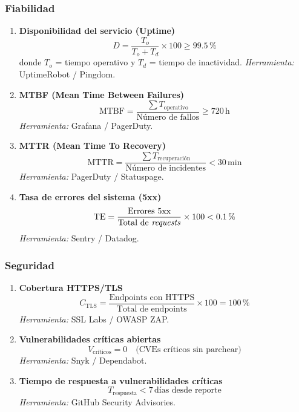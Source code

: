 \documentclass[12pt, a4paper]{article}
\begin{document}
\subsubsection*{Fiabilidad}

\begin{enumerate}[leftmargin=*, label=\textbf{KPI \arabic*.}, start=14]

    \item \textbf{Disponibilidad del servicio (Uptime)}
    \[
        D = \frac{T_o}{T_o + T_d} \times 100 \geq 99.5\,\%
    \]
    donde $T_o$ = tiempo operativo y $T_d$ = tiempo de inactividad. \textit{Herramienta:} UptimeRobot / Pingdom.

    \item \textbf{MTBF (Mean Time Between Failures)}
    \[
        \text{MTBF} = \frac{\sum T_{\text{operativo}}}{\text{Número de fallos}} \geq 720\,\text{h}
    \]
    \textit{Herramienta:} Grafana / PagerDuty.

    \item \textbf{MTTR (Mean Time To Recovery)}
    \[
        \text{MTTR} = \frac{\sum T_{\text{recuperación}}}{\text{Número de incidentes}} < 30\,\text{min}
    \]
    \textit{Herramienta:} PagerDuty / Statuspage.

    \item \textbf{Tasa de errores del sistema (5xx)}
    \[
        \text{TE} = \frac{\text{Errores 5xx}}{\text{Total de \textit{requests}}} \times 100 < 0.1\,\%
    \]
    \textit{Herramienta:} Sentry / Datadog.

\end{enumerate}

\subsubsection*{Seguridad}

\begin{enumerate}[leftmargin=*, label=\textbf{KPI \arabic*.}, start=18]

    \item \textbf{Cobertura HTTPS/TLS}
    \[
        C_{\text{TLS}} = \frac{\text{Endpoints con HTTPS}}{\text{Total de endpoints}} \times 100 = 100\,\%
    \]
    \textit{Herramienta:} SSL Labs / OWASP ZAP.

    \item \textbf{Vulnerabilidades críticas abiertas}
    \[
        V_{\text{críticos}} = 0 \quad \text{(CVEs críticos sin parchear)}
    \]
    \textit{Herramienta:} Snyk / Dependabot.

    \item \textbf{Tiempo de respuesta a vulnerabilidades críticas}
    \[
        T_{\text{respuesta}} < 7\,\text{días desde reporte}
    \]
    \textit{Herramienta:} GitHub Security Advisories.

\end{enumerate}
\end{document}
